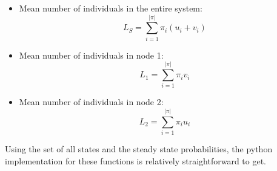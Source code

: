 \begin{itemize}
    \item Mean number of individuals in the entire system:
        \begin{equation}
            L_S = \sum_{i=1}^{|\pi|} \pi_i (u_i + v_i)
        \end{equation}
    \item Mean number of individuals in node 1:
        \begin{equation}
            L_1 = \sum_{i=1}^{|\pi|} \pi_i v_i
        \end{equation}
    \item Mean number of individuals in node 2:
        \begin{equation}
            L_2 = \sum_{i=1}^{|\pi|} \pi_i u_i
        \end{equation}
\end{itemize}

Using the set of all states and the steady state probabilities, the python
implementation for these functions is relatively straightforward to get.

